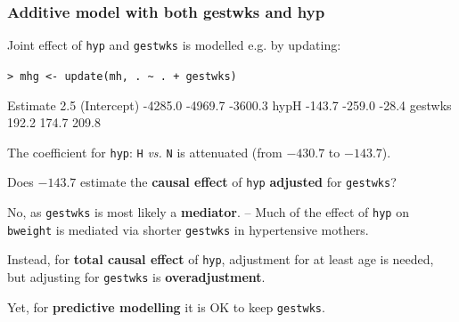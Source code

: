 \documentclass[12pt,dvipsnames,t,handout%
,aspectratio=169%
]{beamer}
\begin{document}
\begin{frame}[fragile]\frametitle{Additive model with both gestwks and hyp}

\bi
\item
Joint effect of
 \texttt{hyp} and \texttt{gestwks} %
 is modelled e.g. by updating: %

\medskip
\verb|> mhg <- update(mh, . ~ . + gestwks)|
{\small
\begin{semiverbatim}
            Estimate    2.5%
(Intercept)  -4285.0 -4969.7 -3600.3
hypH          -143.7  -259.0   -28.4
gestwks        192.2   174.7   209.8
\end{semiverbatim}
}
\medskip
\item
The coefficient for {\tt hyp}: {\tt H} {\it vs.} {\tt N}
 is attenuated (from $-430.7$ to $-143.7$). 
\medskip
\item 
Does $-143.7$ estimate the \textbf{causal effect} of \texttt{hyp}
\textbf{adjusted} for \texttt{gestwks}?
\medskip
\item
No, as \texttt{gestwks} is most likely a \textbf{mediator}. --  
Much of the effect of \texttt{hyp} on 
\texttt{bweight} is mediated via
shorter \texttt{gestwks} in hypertensive mothers.
\medskip
\item
Instead, for \textbf{total causal effect} of \texttt{hyp}, 
adjustment for at least age is needed, but adjusting for \texttt{gestwks}
is \textbf{overadjustment}. 
\medskip
\item
Yet, for \textbf{predictive
modelling} it is OK to keep \texttt{gestwks}. 
\ei


\end{frame}
\end{document}
